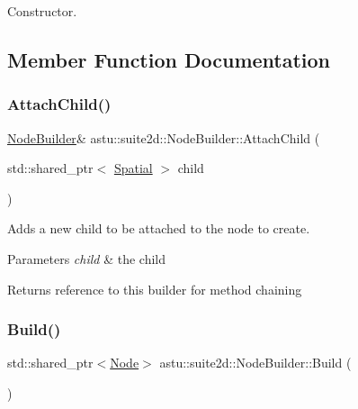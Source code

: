 Constructor. 

\subsection{Member Function Documentation}
\mbox{\label{classastu_1_1suite2d_1_1NodeBuilder_a27c7bef4a7b0206f5b348a966dd1bf65}} 
\subsubsection{\texorpdfstring{Attach\+Child()}{AttachChild()}}
{\footnotesize\ttfamily \hyperlink{classastu_1_1suite2d_1_1NodeBuilder}{Node\+Builder}\& astu\+::suite2d\+::\+Node\+Builder\+::\+Attach\+Child (\begin{DoxyParamCaption}\item[{std\+::shared\+\_\+ptr$<$ \hyperlink{classastu_1_1suite2d_1_1Spatial}{Spatial} $>$}]{child }\end{DoxyParamCaption})\hspace{0.3cm}{\ttfamily [inline]}}

Adds a new child to be attached to the node to create.


\begin{DoxyParams}{Parameters}
{\em child} & the child \\
\hline
\end{DoxyParams}
\begin{DoxyReturn}{Returns}
reference to this builder for method chaining 
\end{DoxyReturn}
\mbox{\label{classastu_1_1suite2d_1_1NodeBuilder_aa6fe121083b0772242e6e38d2a109970}} 
\subsubsection{\texorpdfstring{Build()}{Build()}}
{\footnotesize\ttfamily std\+::shared\+\_\+ptr$<$\hyperlink{classastu_1_1suite2d_1_1Node}{Node}$>$ astu\+::suite2d\+::\+Node\+Builder\+::\+Build (\begin{DoxyParamCaption}{ }\end{DoxyParamCaption})\hspace{0.3cm}{\ttfamily [inline]}}

